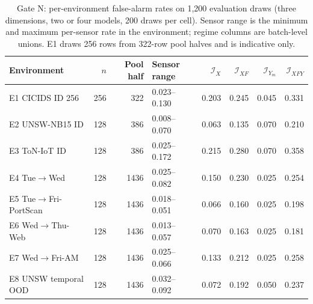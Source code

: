 \begin{table}[!t]
\caption{Gate N: per-environment false-alarm rates on 1,200 evaluation draws (three dimensions, two or four models, 200 draws per cell). Sensor range is the minimum and maximum per-sensor rate in the environment; regime columns are batch-level unions. E1 draws 256 rows from 322-row pool halves and is indicative only.}
\label{tab:s-fpr-env}
\centering
\footnotesize
\setlength{\tabcolsep}{5pt}
\begin{tabular}{@{}lrrlrrrr@{}}
\toprule
Environment & $n$ & Pool half & Sensor range & $\mathcal I_X$ & $\mathcal I_{XF}$ & $\mathcal I_{Y_m}$ & $\mathcal I_{XFY}$ \\
\midrule
E1 CICIDS ID 256 & 256 & 322 & 0.023--0.130 & 0.203 & 0.245 & 0.045 & 0.331 \\
E2 UNSW-NB15 ID & 128 & 386 & 0.008--0.070 & 0.063 & 0.135 & 0.070 & 0.210 \\
E3 ToN-IoT ID & 128 & 386 & 0.025--0.172 & 0.215 & 0.280 & 0.070 & 0.358 \\
E4 Tue$\to$Wed & 128 & 1436 & 0.025--0.082 & 0.150 & 0.230 & 0.025 & 0.254 \\
E5 Tue$\to$Fri-PortScan & 128 & 1436 & 0.018--0.051 & 0.066 & 0.160 & 0.025 & 0.198 \\
E6 Wed$\to$Thu-Web & 128 & 1436 & 0.013--0.057 & 0.070 & 0.163 & 0.025 & 0.181 \\
E7 Wed$\to$Fri-AM & 128 & 1436 & 0.025--0.066 & 0.133 & 0.212 & 0.025 & 0.258 \\
E8 UNSW temporal OOD & 128 & 1436 & 0.032--0.092 & 0.072 & 0.192 & 0.050 & 0.237 \\
\bottomrule
\end{tabular}
\end{table}
